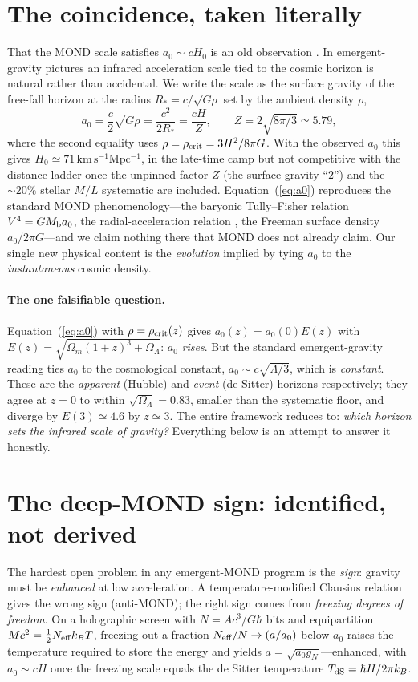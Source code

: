 \documentclass[11pt]{article}
\newcommand{\az}{a_0}
\newcommand{\Ez}{E(z)}
\begin{document}
\section{The coincidence, taken literally}
That the MOND scale satisfies $\az\sim cH_0$ is an old observation \cite{milgrom1983,famaey2012}. In
emergent-gravity pictures \cite{jacobson1995,verlinde2011} an infrared acceleration scale tied to the
cosmic horizon is natural rather than accidental. We write the scale as the surface gravity of the
free-fall horizon at the radius $R_*=c/\sqrt{G\rho}$ set by the ambient density $\rho$,
\begin{equation}
  \az=\frac{c}{2}\sqrt{G\rho}=\frac{c^2}{2R_*}=\frac{cH}{Z},\qquad Z=2\sqrt{8\pi/3}\simeq5.79,
  \label{eq:a0}
\end{equation}
where the second equality uses $\rho=\rho_{\rm crit}=3H^2/8\pi G$. With the observed $\az$ this gives
$H_0\simeq71\,\mathrm{km\,s^{-1}Mpc^{-1}}$, in the late-time camp but not competitive with the distance
ladder once the unpinned factor $Z$ (the surface-gravity ``$2$'') and the ${\sim}20\%$ stellar $M/L$
systematic are included. Equation~(\ref{eq:a0}) reproduces the standard MOND phenomenology---the
baryonic Tully--Fisher relation $V^4=G M_{\rm b}\az$, the radial-acceleration relation
\cite{mcgaugh2016}, the Freeman surface density $\az/2\pi G$---and we claim nothing there that MOND does
not already claim. Our single new physical content is the \emph{evolution} implied by tying $\az$ to the
\emph{instantaneous} cosmic density.

\paragraph{The one falsifiable question.} Equation~(\ref{eq:a0}) with $\rho=\rho_{\rm crit}(z)$ gives
$\az(z)=\az(0)\Ez$ with $\Ez=\sqrt{\Omega_m(1+z)^3+\Omega_\Lambda}$: $\az$ \emph{rises}. But the standard
emergent-gravity reading ties $\az$ to the cosmological constant, $\az\sim c\sqrt{\Lambda/3}$, which is
\emph{constant}. These are the \emph{apparent} (Hubble) and \emph{event} (de Sitter) horizons
respectively; they agree at $z=0$ to within $\sqrt{\Omega_\Lambda}=0.83$, smaller than the systematic
floor, and diverge by $E(3)\simeq4.6$ by $z\simeq3$. The entire framework reduces to: \emph{which horizon
sets the infrared scale of gravity?} Everything below is an attempt to answer it honestly.

\section{The deep-MOND sign: identified, not derived}
The hardest open problem in any emergent-MOND program is the \emph{sign}: gravity must be
\emph{enhanced} at low acceleration. A temperature-modified Clausius relation gives the wrong sign
(anti-MOND); the right sign comes from \emph{freezing degrees of freedom}. On a holographic screen with
$N=Ac^3/G\hbar$ bits and equipartition $Mc^2=\tfrac12 N_{\rm eff}k_BT$, freezing out a fraction
$N_{\rm eff}/N\to(a/\az)$ below $\az$ raises the temperature required to store the energy and yields
$a=\sqrt{\az g_N}$---enhanced, with $\az\sim cH$ once the freezing scale equals the de Sitter
temperature $T_{\rm dS}=\hbar H/2\pi k_B$.
\end{document}
